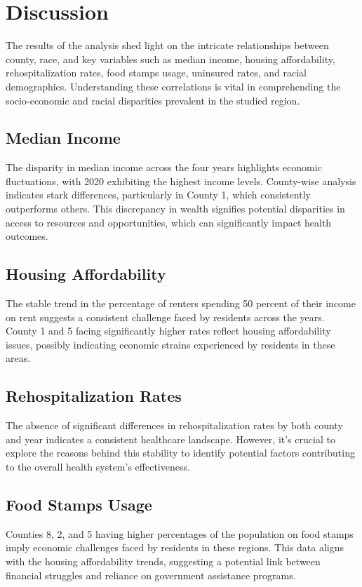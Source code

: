 \documentclass[12pt]{article}
\begin{document}
\section{Discussion}\label{sec:disc}

The results of the analysis shed light on the intricate relationships between county, race, and key 
variables such as median income, housing affordability, rehospitalization rates, food stamps usage, 
uninsured rates, and racial demographics. Understanding these correlations is vital in comprehending 
the socio-economic and racial disparities prevalent in the studied region.

\subsection{Median Income}
The disparity in median income across the four years highlights economic fluctuations, with 
2020 exhibiting the highest income levels. County-wise analysis indicates stark differences, 
particularly in County 1, which consistently outperforms others. This discrepancy in wealth signifies 
potential disparities in access to resources and opportunities, which can significantly impact health outcomes.

\subsection{Housing Affordability}
The stable trend in the percentage of renters spending 50 percent of their income on rent suggests a 
consistent challenge faced by residents across the years. County 1 and 5 facing significantly higher 
rates reflect housing affordability issues, possibly indicating economic strains experienced by residents in these areas.

\subsection{Rehospitalization Rates}
The absence of significant differences in rehospitalization rates by both county and year indicates 
a consistent healthcare landscape. However, it's crucial to explore the reasons behind this stability to identify 
potential factors contributing to the overall health system's effectiveness.

\subsection{Food Stamps Usage}
Counties 8, 2, and 5 having higher percentages of the population on food stamps imply economic challenges 
faced by residents in these regions. This data aligns with the housing affordability trends, suggesting a potential 
link between financial struggles and reliance on government assistance programs.
\end{document}

